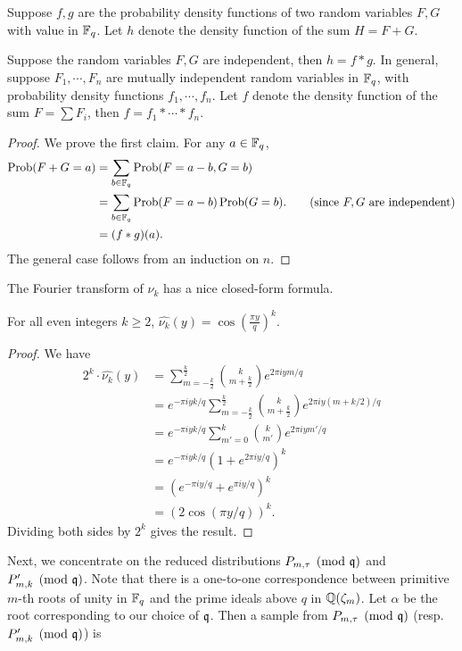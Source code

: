 \documentclass{amsart}
\begin{document}
Suppose $f,g$ are the probability density functions of two random variables $F,G$ with value in $\mathbb{F}_q$. Let $h$ denote the density function of the sum $H =F+G$.

\begin{Lemma}
Suppose the random variables $F,G$ are independent, then $h =  f \ast g$.
In general, suppose $F_1, \cdots, F_n$ are mutually independent random variables in $\mathbb{F}_q$, with probability density functions $f_1, \cdots, f_n$. Let $f$ denote the density function of the sum $F = \sum F_i$, then $f = f_1 \ast \cdots \ast f_n$.
\end{Lemma}

\begin{proof}
We prove the first claim. For any $a \in \mathbb{F}_q$,
\begin{align*}
\operatorname{Prob}(F+G = a) &= \sum_{b \in \mathbb{F}_q} \operatorname{Prob}(F = a-b, G =b) \\
& = \sum_{b \in \mathbb{F}_q} \operatorname{Prob}(F = a-b)\operatorname{Prob}(G =b).  \qquad \mbox{(since $F,G$ are independent)} \\
& = (f \ast g)(a).
\end{align*}
The general case follows from an induction on $n$.
\end{proof}

The Fourier transform of $\nu_k$ has a nice closed-form formula.
\begin{Lemma}
\label{lem: transform1}
For all even integers $k \geq 2$, $\widehat{\nu_k}(y)  = \cos \left(\frac{\pi y}{q}\right)^k.$
\end{Lemma}

\begin{proof}  We have
\begin{align*}
2^k \cdot \widehat{\nu_k}(y) &= \sum_{m = -\frac{k}{2}}^{\frac{k}{2}} {k \choose m+\frac{k}{2}} e^{2\pi i ym/q}  \\
&= e^{-\pi i yk/q}\sum_{m = -\frac{k}{2}}^{\frac{k}{2}} {k \choose m+\frac{k}{2}} e^{2\pi i y(m+k/2)/q} \\
&= e^{-\pi i yk/q} \sum_{m' = 0}^{k} {k \choose m'} e^{2\pi i ym'/q} \\
& =  e^{-\pi i yk/q} (1+ e^{2 \pi i y/q})^k \\
& = (e^{-\pi i y/q} + e^{\pi i y/q})^k  \\
& = (2 \cos(\pi y/q))^k.
\end{align*}
Dividing both sides by $2^k$ gives the result.
\end{proof}


Next, we concentrate on the reduced distributions $P_{m,\tau} \pmod{\mathfrak{q}}$ and $P'_{m,k} \pmod {\mathfrak{q}}$. Note that there is a one-to-one correspondence between primitive $m$-th roots of unity in $\mathbb{F}_q$ and the prime ideals above $q$ in $\mathbb{Q}(\zeta_m)$. Let $\alpha$ be the root corresponding to our choice of $\mathfrak{q}$. Then a sample from $P_{m, \tau} \pmod{\mathfrak{q}}$ (resp. $P'_{m,k} \pmod {\mathfrak{q}}$) is
\end{document}

